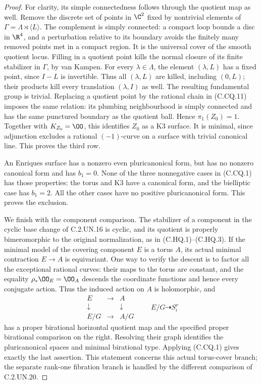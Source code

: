 \begin{proof}
For clarity, its simple connectedness follows
through the quotient map as well. Remove the
discrete set of points in $\C^2$ fixed by
nontrivial elements of
$\Gamma=\Lambda\rtimes\langle L\rangle$.
The complement is simply connected: a compact
loop bounds a disc in $\R^4$, and a perturbation
relative to its boundary avoids the finitely
many removed points met in a compact region.
It is the universal cover of the smooth
quotient locus. Filling in a quotient point
kills the normal closure of its finite
stabilizer in $\Gamma$, by van Kampen.
For every $\lambda\in\Lambda$, the element
$(\lambda,L)$ has a fixed point, since $I-L$
is invertible. Thus all $(\lambda,L)$ are
killed, including $(0,L)$; their products
kill every translation $(\lambda,I)$ as well.
The resulting fundamental group is trivial.
Replacing a quotient point by the rational
chain in (C.CQ.11) imposes the same relation:
its plumbing neighbourhood is simply connected
and has the same punctured boundary as the
quotient ball. Hence $\pi_1(Z_0)=1$.
Together with $K_{Z_0}=\OO$, this identifies
$Z_0$ as a K3 surface. It is minimal, since
adjunction excludes a rational $(-1)$-curve
on a surface with trivial canonical line.
This proves the third row.

An Enriques surface has a nonzero even
pluricanonical form, but has no nonzero
canonical form and has $b_1=0$. None of
the three nonnegative cases in (C.CQ.1)
has those properties: the torus and K3
have a canonical form, and the bielliptic
case has $b_1=2$. All the other cases
have no positive pluricanonical form.
This proves the exclusion.

We finish with the component comparison.
The stabilizer of a component in the
cyclic base change of C.2.UN.16 is cyclic,
and its quotient is properly bimeromorphic
to the original normalization, as in
(C.HQ.1)--(C.HQ.3). If the minimal model
of the covering component $E$ is a torus
$A$, its actual minimal contraction
$E\to A$ is equivariant. One way to
verify the descent is to factor all the
exceptional rational curves: their maps
to the torus are constant, and the
equality $\rho_*\OO_E=\OO_A$ descends
the coordinate functions and hence
every conjugate action. Thus the induced
action on $A$ is holomorphic, and
\[
 \begin{array}{ccc}
 E&\longrightarrow&A\\
 \downarrow&&\downarrow\\
 E/G&\longrightarrow&A/G
 \end{array}
 \qquad
             E/G\dashrightarrow S_i^\nu
                                                               \tag{C.CQ.12}
\]
has a proper birational horizontal quotient
map and the specified proper birational
comparison on the right. Resolving their
graph identifies the pluricanonical
spaces and minimal birational type.
Applying (C.CQ.1) gives exactly the last
assertion. This statement concerns this
actual torus-cover branch; the separate
rank-one fibration branch is handled by
the different comparison of C.2.UN.20.
\end{proof}


